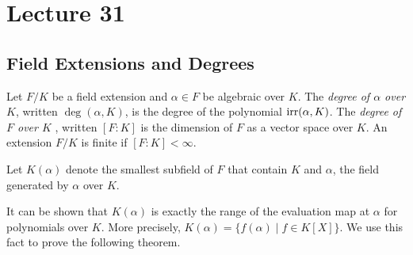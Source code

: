 \section{Lecture 31}
\subsection{Field Extensions and Degrees}
\begin{definition}
  Let $F/K$ be a field extension and $\alpha\in F$ be algebraic over $K$. The
  \emph{degree of $\alpha$ over $K$}, written $\deg(\alpha, K)$, is the degree of the
  polynomial $\operatorname{irr}(\alpha, K)$.
  The \emph{degree of $F$ over $K$ }, written $[F:K]$ is the dimension of $F$ as a vector
  space over $K$. An extension $F/K$ is finite if $[F:K]<\infty$.
\end{definition}




\begin{definition}
  Let $K(\alpha)$ denote the smallest subfield of $F$ that contain $K$ and $\alpha$, the
  field generated by $\alpha$ over $K.$
\end{definition}

It can be shown that $K(\alpha)$ is exactly the range of the evaluation map at $\alpha$ for polynomials over $K$. More precisely, 
$K(\alpha) = \{f(\alpha) \mid f \in K[X]\}$. We use this fact to prove the following theorem.

